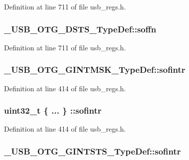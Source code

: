 Definition at line 711 of file usb\-\_\-regs.\-h.

\hypertarget{group___u_s_b___o_t_g___d_r_i_v_e_r_ga5416ffe4780ad95cc3dfb9bee8549ab8}{
\subsubsection[{soffn}]{ \-\_\-\-U\-S\-B\-\_\-\-O\-T\-G\-\_\-\-D\-S\-T\-S\-\_\-\-Type\-Def\-::soffn}}\label{group___u_s_b___o_t_g___d_r_i_v_e_r_ga5416ffe4780ad95cc3dfb9bee8549ab8}


Definition at line 711 of file usb\-\_\-regs.\-h.

\hypertarget{group___u_s_b___o_t_g___d_r_i_v_e_r_gace026c7872dc91338173935f546515a6}{
\subsubsection[{sofintr}]{ \-\_\-\-U\-S\-B\-\_\-\-O\-T\-G\-\_\-\-G\-I\-N\-T\-M\-S\-K\-\_\-\-Type\-Def\-::sofintr}}\label{group___u_s_b___o_t_g___d_r_i_v_e_r_gace026c7872dc91338173935f546515a6}


Definition at line 414 of file usb\-\_\-regs.\-h.

\hypertarget{group___u_s_b___o_t_g___d_r_i_v_e_r_ga70ea112e8626bdc9a5a5ec6e91d272f8}{
\subsubsection[{sofintr}]{\setlength{\rightskip}{0pt plus 5cm}uint32\-\_\-t \{ ... \} \-::sofintr}}\label{group___u_s_b___o_t_g___d_r_i_v_e_r_ga70ea112e8626bdc9a5a5ec6e91d272f8}


Definition at line 414 of file usb\-\_\-regs.\-h.

\hypertarget{group___u_s_b___o_t_g___d_r_i_v_e_r_ga90db453bd6bcb2c78bab6c0688727181}{
\subsubsection[{sofintr}]{ \-\_\-\-U\-S\-B\-\_\-\-O\-T\-G\-\_\-\-G\-I\-N\-T\-S\-T\-S\-\_\-\-Type\-Def\-::sofintr}}\label{group___u_s_b___o_t_g___d_r_i_v_e_r_ga90db453bd6bcb2c78bab6c0688727181}


